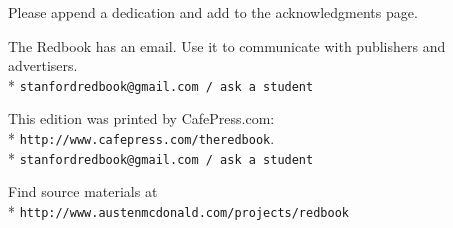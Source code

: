 \documentclass[10pt]{book}
\begin{document}
Please append a dedication and add to the acknowledgments page.

{\footnotesize
The Redbook has an email. Use it to communicate with publishers and
advertisers.\\*
\verb+stanfordredbook@gmail.com / ask a student+

This edition was printed by CafePress.com:\\*
\verb+http://www.cafepress.com/theredbook+.\\*
\verb+stanfordredbook@gmail.com / ask a student+

Find source materials at\\*
\verb+http://www.austenmcdonald.com/projects/redbook+}

\vfill\eject
\thispagestyle{empty}
\mbox{}
\vfill\eject
\thispagestyle{empty}
\mbox{}
\vfill\eject
\thispagestyle{empty}
\mbox{}
\vfill\eject
\thispagestyle{empty}
\mbox{}
\vfill\eject
\thispagestyle{empty}
\mbox{}
\vfill\eject
\thispagestyle{empty}
\mbox{}
\vfill\eject
\thispagestyle{empty}
\mbox{}
\vfill\eject
\thispagestyle{empty}
\mbox{}
\vfill\eject
\end{document}
